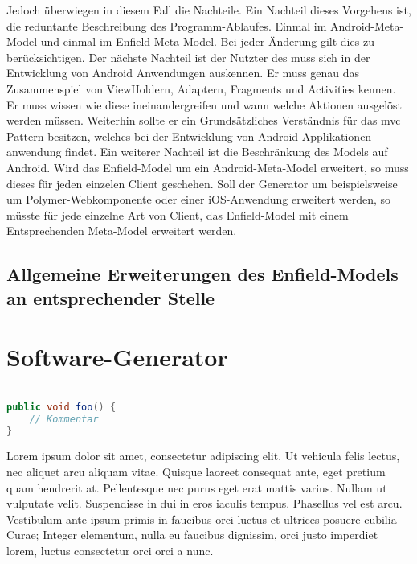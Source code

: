 Jedoch überwiegen in diesem Fall die Nachteile. Ein Nachteil dieses Vorgehens ist, die reduntante Beschreibung des Programm-Ablaufes. Einmal im Android-Meta-Model und einmal im Enfield-Meta-Model. Bei jeder Änderung gilt dies zu berücksichtigen. 
Der nächste Nachteil ist der Nutzter des muss sich in der Entwicklung von Android Anwendungen auskennen. Er muss genau das Zusammenspiel von ViewHoldern, Adaptern, Fragments und Activities kennen. Er muss wissen wie diese ineinandergreifen und wann welche Aktionen ausgelöst werden müssen. Weiterhin sollte er ein Grundsätzliches Verständnis für das \acf{mvc} Pattern besitzen, welches bei der Entwicklung von Android Applikationen anwendung findet.
Ein weiterer Nachteil ist die Beschränkung des Models auf Android. Wird das Enfield-Model um ein Android-Meta-Model erweitert, so muss dieses für jeden einzelen Client geschehen. Soll der Generator um beispielsweise um Polymer-Webkomponente oder einer iOS-Anwendung erweitert werden, so müsste für jede einzelne Art von Client, das Enfield-Model mit einem Entsprechenden Meta-Model erweitert werden.

\subsection{Allgemeine Erweiterungen des Enfield-Models an entsprechender Stelle}

\section{Software-Generator}











\begin{lstlisting}[label=lst:java,
				   language=java,
				   firstnumber=1,
				   caption=Beispiel für einen Quelltext]				   

public void foo() {				   
	// Kommentar
}
\end{lstlisting}

Lorem ipsum dolor sit amet, consectetur adipiscing elit. Ut vehicula felis lectus, nec aliquet arcu aliquam vitae. Quisque laoreet consequat ante, eget pretium quam hendrerit at. Pellentesque nec purus eget erat mattis varius. Nullam ut vulputate velit. Suspendisse in dui in eros iaculis tempus. Phasellus vel est arcu. Vestibulum ante ipsum primis in faucibus orci luctus et ultrices posuere cubilia Curae; Integer elementum, nulla eu faucibus dignissim, orci justo imperdiet lorem, luctus consectetur orci orci a nunc.

